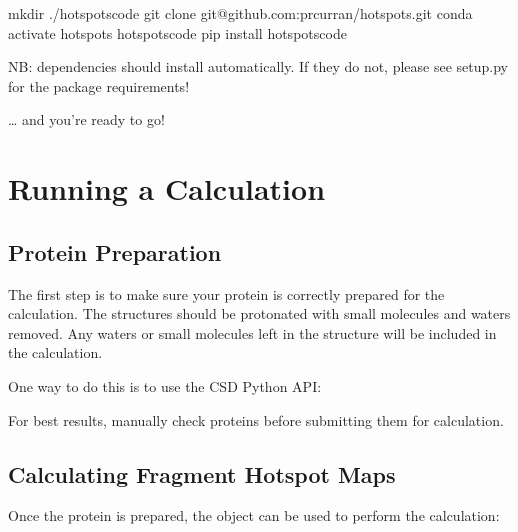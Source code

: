 \documentclass[letterpaper,10pt,english]{sphinxmanual}
\begin{document}
\begin{sphinxVerbatim}[commandchars=\\\{\}]
mkdir ./hotspots\PYGZus{}code
git clone git@github.com:prcurran/hotspots.git
conda activate hotspots
 hotspots\PYGZus{}code
pip install hotspots\PYGZus{}code
\end{sphinxVerbatim}

NB: dependencies should install automatically. If they do not, please see setup.py for the package requirements!

… and you’re ready to go!


\section{Running a Calculation}
\label{\detokenize{tutorial:running-a-calculation}}

\subsection{Protein Preparation}
\label{\detokenize{tutorial:protein-preparation}}
The first step is to make sure your protein is correctly prepared for the calculation. The structures should be
protonated with small molecules and waters removed. Any waters or small molecules left in the structure will be included
in the calculation.

One way to do this is to use the CSD Python API:

\begin{sphinxVerbatim}[commandchars=\\\{\}]
   

  
   
\end{sphinxVerbatim}

For best results, manually check proteins before submitting them for calculation.


\subsection{Calculating Fragment Hotspot Maps}
\label{\detokenize{tutorial:calculating-fragment-hotspot-maps}}
Once the protein is prepared, the {\hyperref[\detokenize{calculation_api:hotspots.calculation.Runner}]{}} object can be used to perform the calculation:
\end{document}

